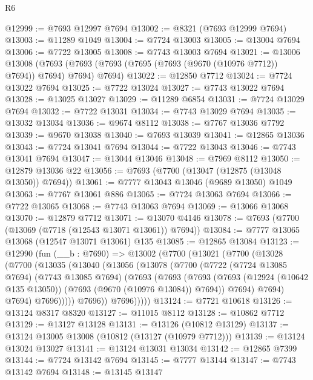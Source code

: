 \begin{lexlean}{R6}
\begin{coremodule}
@12999 := @7693 @12997 @7694
@13002 := @8321 (@7693 @12999 @7694)
@13003 := @11289 @1049
@13004 := @7724 @13003
@13005 := @13004 @7694
@13006 := @7722 @13005
@13008 := @7743 @13003 @7694
@13021 := @13006
    @13008
    (@7693 (@7693 (@7693 (@7695 (@7693 (@9670 (@10976 @7712)) @7694)) @7694) @7694) @7694)
@13022 := @12850 @7712
@13024 := @7724 @13022 @7694
@13025 := @7722 @13024
@13027 := @7743 @13022 @7694
@13028 := @13025 @13027
@13029 := @11289 @6854
@13031 := @7724 @13029 @7694
@13032 := @7722 @13031
@13034 := @7743 @13029 @7694
@13035 := @13032 @13034
@13036 := @9674 @8112
@13038 := @7767 @13036 @7792
@13039 := @9670 @13038
@13040 := @7693 @13039
@13041 := @12865 @13036
@13043 := @7724 @13041 @7694
@13044 := @7722 @13043
@13046 := @7743 @13041 @7694
@13047 := @13044 @13046
@13048 := @7969 @8112
@13050 := @12879 @13036 @22
@13056 := @7693 (@7700 (@13047 (@12875 (@13048 @13050)) @7694))
@13061 := @7777 @13043 @13046 (@9689 @13050) @1049
@13063 := @7767 @13061 @886
@13065 := @7724 @13063 @7694
@13066 := @7722 @13065
@13068 := @7743 @13063 @7694
@13069 := @13066 @13068
@13070 := @12879 @7712
@13071 := @13070 @4146
@13078 := @7693 (@7700 (@13069 (@7718 (@12543 @13071 @13061)) @7694))
@13084 := @7777 @13065 @13068 (@12547 @13071 @13061) @135
@13085 := @12865 @13084
@13123 := @12990
    (fun (__b : @7690) =>
    @13002
      (@7700
        (@13021
          (@7700
            (@13028
              (@7700
                (@13035
                  (@13040
                    (@13056
                      (@13078
                        (@7700
                          (@7722
                            (@7724 @13085 @7694)
                            (@7743 @13085 @7694)
                            (@7693
                              (@7693
                                (@7693
                                  (@7693
                                    (@12924 (@10642 @135 @13050))
                                    (@7693 (@9670 (@10976 @13084)) @7694))
                                  @7694)
                                @7694)
                              @7694)
                            @7696)))))
                  @7696))
              @7696)))))
@13124 := @7721 @10618
@13126 := @13124 @8317 @8320
@13127 := @11015 @8112
@13128 := @10862 @7712
@13129 := @13127 @13128
@13131 := @13126 (@10812 @13129)
@13137 := @13124 @13005 @13008 (@10812 (@13127 (@10979 @7712)))
@13139 := @13124 @13024 @13027
@13141 := @13124 @13031 @13034
@13142 := @12865 @7399
@13144 := @7724 @13142 @7694
@13145 := @7777 @13144
@13147 := @7743 @13142 @7694
@13148 := @13145 @13147

\end{coremodule}
\end{lexlean}
